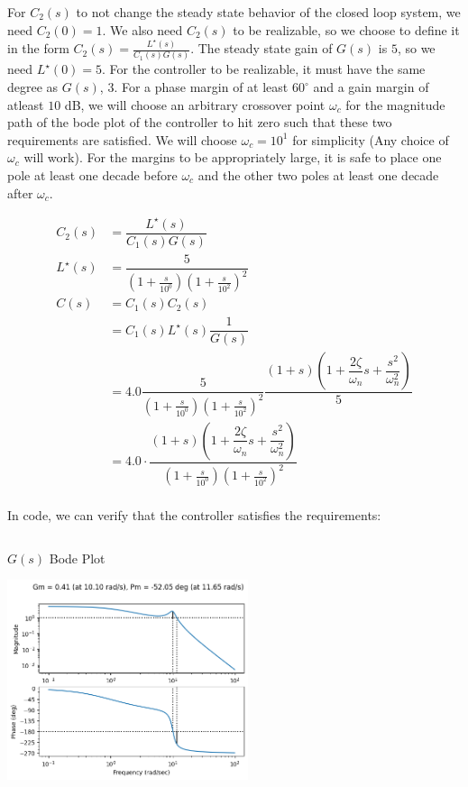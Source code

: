\documentclass[11pt]{article}
\begin{document}
For $C_2(s)$ to not change the steady state behavior of the closed loop system, we need $C_2(0) = 1$. We also need $C_2(s)$ to be realizable, so we choose to define it in the form $C_2(s) = \frac{L^\star(s)}{C_1(s) G(s)}$. The steady state gain of $G(s)$ is $5$, so we need $L^\star(0) = 5$. For the controller to be realizable, it must have the same degree as $G(s)$, 3. For a phase margin of at least $60^\circ$ and a gain margin of atleast $10$ dB, we will choose an arbitrary crossover point $\omega_c$ for the magnitude path of the bode plot of the controller to hit zero such that these two requirements are satisfied. We will choose $\omega_c = 10^1$ for simplicity (Any choice of $\omega_c$ will work). For the margins to be appropriately large, it is safe to place one pole at least one decade before $\omega_c$ and the other two poles at least one decade after $\omega_c$. 

\begin{align*}
  C_2(s) &= \dfrac{L^\star(s)}{C_1(s) G(s)} \\
  L^\star(s) &= \dfrac{5}{(1 + \frac{s}{10^0})(1 + \frac{s}{10^2})^2} \\
  C(s) &= C_1(s) C_2(s) \\
  &= C_1(s) L^\star(s) \dfrac{1}{G(s)} \\
  &= 4.0 \dfrac{5}{(1 + \frac{s}{10^0})(1 + \frac{s}{10^2})^2} \dfrac{(1 + s) \left(1 + \dfrac{2 \zeta}{\omega_n} s + \dfrac{s^2}{\omega_n^2} \right)}{5} \\
  &= 4.0 \cdot \dfrac{(1 + s) \left(1 + \dfrac{2 \zeta}{\omega_n} s + \dfrac{s^2}{\omega_n^2} \right)}{(1 + \frac{s}{10^0})(1 + \frac{s}{10^2})^2} \\
\end{align*}

In code, we can verify that the controller satisfies the requirements:

\inputminted{python}{a4_1.py}

$G(s)$ Bode Plot

\includegraphics[width=200pt]{a4_2.png}
  
\end{document}
